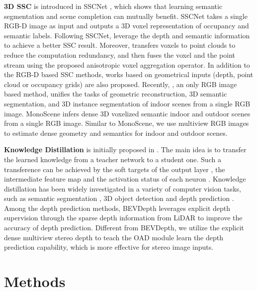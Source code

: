 \documentclass{article}
\begin{document}
	\textbf{3D SSC} is introduced in SSCNet \cite{song2017semantic}, which shows that learning semantic segmentation and scene completion can mutually benefit. SSCNet takes a single RGB-D image as input and outputs a 3D voxel representation of occupancy and semantic labels. Following SSCNet, \cite{garbade2019two,li2020attention} leverage the depth and semantic information to achieve a better SSC result. Moreover, \cite{tang2022not} transfers voxels to point clouds to reduce the computation redundancy, and then fuses the voxel and the point stream using the proposed anisotropic voxel aggregation operator. In addition to the RGB-D based SSC methods, works \cite{cheng2021s3cnet,wu2020scfusion,yang2021semantic,yan2021sparse,rist2021semantic} based on geometrical inputs (depth, point cloud or occupancy grids) are also proposed. Recently, \cite{dahnert2021panoptic}, an only RGB image based method, unifies the tasks of geometric reconstruction, 3D semantic segmentation, and 3D instance segmentation of indoor scenes from a single RGB image. MonoScene \cite{Cao_2022_CVPR} infers dense 3D voxelized semantic indoor and outdoor scenes from a single RGB image. Similar to MonoScene, we use multiview RGB images to estimate dense geometry and semantics for indoor and outdoor scenes.
	
	
	\textbf{Knowledge Distillation} is initially proposed in \cite{hinton2015distilling}. The main idea is to transfer the learned knowledge from a teacher network to a student one. Such a transference can be achieved by the soft targets of the output layer \cite{hinton2015distilling}, the intermediate feature map \cite{romero2014fitnets} and the activation status of each neuron \cite{huang2017like}. Knowledge distillation has been widely investigated in a variety of computer vision tasks, such as semantic segmentation \cite{hou2020inter,liu2019structured}, 3D object detection \cite{chong2022monodistill,zheng2022boosting} and depth prediction \cite{pilzer2019refine,ye2019student}. Among the depth prediction methods, BEVDepth \cite{li2022bevdepth} leverages explicit depth supervision through the sparse depth information from LiDAR to improve the accuracy of depth prediction. Different from BEVDepth, we utilize the explicit dense multiview stereo depth to teach the OAD module learn the depth prediction capability, which is more effective for stereo image inputs.
	
	\section{Methods}
\end{document}
